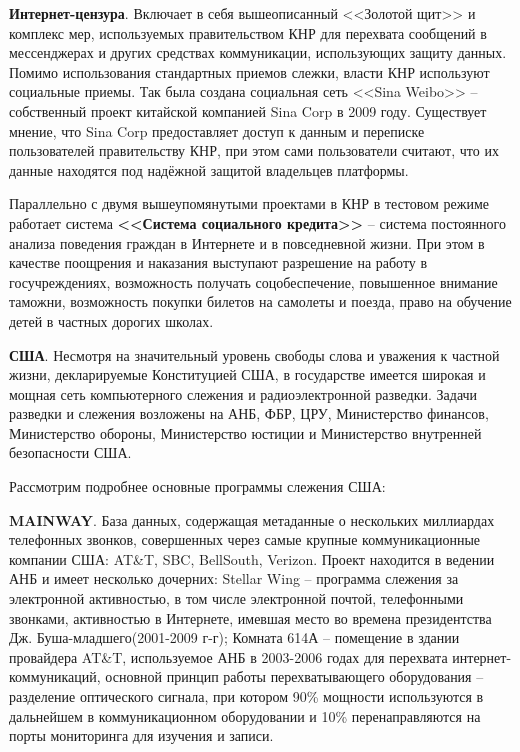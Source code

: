 	\textbf{Интернет-цензура}. Включает в себя вышеописанный <<Золотой щит>> и комплекс мер, используемых правительством КНР для перехвата сообщений в мессенджерах и других средствах коммуникации, использующих защиту данных. 	Помимо использования стандартных приемов слежки, власти КНР используют социальные приемы. Так была создана социальная сеть <<Sina Weibo>> -- собственный проект китайской компанией Sina Corp в 2009 году. Существует мнение, что Sina Corp предоставляет доступ к данным и переписке пользователей правительству КНР, при этом сами пользователи считают, что их данные находятся под надёжной защитой владельцев платформы. 
	
	Параллельно с двумя вышеупомянутыми проектами в КНР в тестовом режиме работает система \textbf{<<Система социального кредита>>} -- система постоянного анализа поведения граждан в Интернете и в повседневной жизни. При этом в качестве поощрения и наказания выступают разрешение на работу в госучреждениях, возможность получать соцобеспечение, повышенное внимание таможни, возможность покупки билетов на самолеты и поезда, право на обучение детей в частных дорогих школах.   %
	
	\textbf{США}. Несмотря на значительный уровень свободы слова и уважения к частной жизни, декларируемые Конституцией США, в государстве имеется широкая и мощная сеть компьютерного слежения и радиоэлектронной разведки. Задачи разведки  и слежения возложены на АНБ, ФБР, ЦРУ, Министерство финансов, Министерство обороны, Министерство юстиции и Министерство внутренней безопасности США.  
	
	Рассмотрим подробнее основные программы слежения США:
	
	\textbf{MAINWAY}. База данных, содержащая метаданные о нескольких миллиардах телефонных звонков, совершенных через самые крупные коммуникационные компании США: AT\&T, SBC, BellSouth, Verizon. Проект находится в ведении  АНБ и имеет несколько дочерних: Stellar Wing -- программа слежения за электронной активностью, в том числе электронной почтой, телефонными звонками, активностью в Интернете, имевшая место во времена президентства Дж. Буша-младшего(2001-2009 г-г);%
	Комната 614А -- помещение в здании провайдера AT\&T, используемое АНБ в 2003-2006 годах для перехвата интернет-коммуникаций, %
	основной принцип работы перехватывающего оборудования -- разделение  оптического сигнала, при котором 90\% мощности  используются в дальнейшем в коммуникационном оборудовании и 10\% перенаправляются на порты мониторинга для изучения и записи.
	

